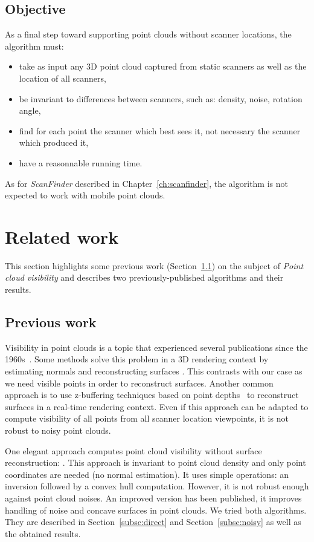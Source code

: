 \subsection{Objective}
\label{subsc:vis-objective}
As a final step toward supporting point clouds without scanner locations, the algorithm must:
\begin{itemize}
\item take as input any 3D point cloud captured from static scanners as well as the location of all scanners,
\item be invariant to differences between scanners, such as: density, noise, rotation angle,
\item find for each point the scanner which best sees it, not necessary the scanner which produced it,
\item have a reasonnable running time.
\end{itemize}

As for \emph{ScanFinder} described in Chapter~\ref{ch:scanfinder}, the algorithm is not expected to work with mobile point clouds.


\section{Related work}
\label{sc:related-visibility}
This section highlights some previous work (Section~\ref{subsc:visibility-prev}) on the subject of \emph{Point cloud visibility} and describes two previously-published algorithms and their results.


\subsection{Previous work}
\label{subsc:visibility-prev}
Visibility in point clouds is a topic that experienced several publications since the 1960s~\cite{appel, sutherland, funkhouser, greene, bittner}. Some methods solve this problem in a 3D rendering context by estimating normals and reconstructing surfaces \cite{sainz1, sainz2, wald, wu}. This contrasts with our case as we need visible points in order to reconstruct surfaces. Another common approach is to use z-buffering techniques based on point depths~\cite{dachsbacher} to reconstruct
surfaces in a real-time rendering context. Even if this approach can be adapted to compute visibility of all points from all scanner location viewpoints, it is not robust to noisy point clouds.

One elegant approach computes point cloud visibility without surface reconstruction: \cite{vis1}. This approach is invariant to point cloud density and only point coordinates are needed (no normal estimation). It uses simple operations: an inversion followed by a convex hull computation. However, it is not robust enough against point cloud noises. An improved version \cite{vis2} has been published, it improves handling of noise and concave surfaces in point clouds.
We tried both algorithms. They are described in Section~\ref{subsc:direct} and Section~\ref{subsc:noisy} as well as the obtained results.


